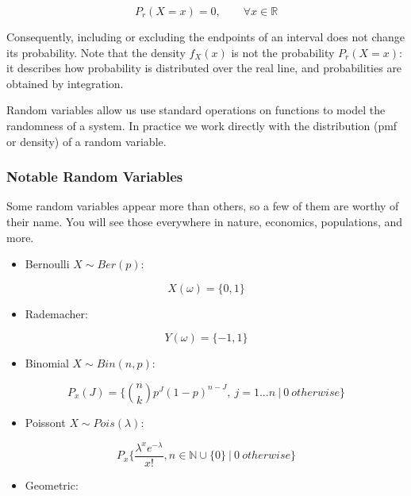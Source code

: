 \documentclass{article}
\begin{document}
\[P_r(X = x) = 0, \qquad \forall x\in \mathbb{R}\]

Consequently, including or excluding the endpoints of an interval does
not change its probability. Note that the density \(f_X(x)\) is not the
probability \(P_r(X=x)\): it describes how probability is distributed
over the real line, and probabilities are obtained by integration.

Random variables allow us use standard operations on functions to model
the randomness of a system. In practice we work directly with the
distribution (pmf or density) of a random variable.

\subsubsection{Notable Random Variables}\label{notable-random-variables}

Some random variables appear more than others, so a few of them are
worthy of their name. You will see those everywhere in nature,
economics, populations, and more.

\begin{itemize}
\tightlist
\item
  Bernoulli \(X \sim Ber(p)\):
\end{itemize}

\[X(\omega)=\{0, 1\}\]

\begin{itemize}
\tightlist
\item
  Rademacher:
\end{itemize}

\[Y(\omega)=\{ -1, 1 \}\]

\begin{itemize}
\tightlist
\item
  Binomial \(X\sim Bin(n, p)\):
\end{itemize}

\[P_x(J)=\{ \binom{n}{k}p^J(1-p)^{n-J},\ j=1...n\ |\ 0\ otherwise \}\]

\begin{itemize}
\tightlist
\item
  Poissont \(X\sim Pois(\lambda)\):
\end{itemize}

\[P_x\{\frac{\lambda^xe^{-\lambda}}{x!}, n\in \mathbb{N}\cup \{ 0 \}\ |\ 0\ otherwise\}\]

\begin{itemize}
\tightlist
\item
  Geometric:
\end{itemize}
\end{document}
